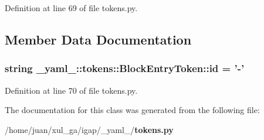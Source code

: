 Definition at line 69 of file tokens.py.

\subsection{Member Data Documentation}
\subsubsection{\setlength{\rightskip}{0pt plus 5cm}string {\bf \_\-yaml\_\-::tokens::BlockEntryToken::id} = '-'\hspace{0.3cm}{\tt  [static]}}\label{class__yaml___1_1tokens_1_1BlockEntryToken_bd377cb4189f9bc79916e23cb1e4e9ef}




Definition at line 70 of file tokens.py.

The documentation for this class was generated from the following file:\begin{CompactItemize}
\item 
/home/juan/xul\_\-ga/igap/\_\-yaml\_\-/{\bf tokens.py}\end{CompactItemize}
